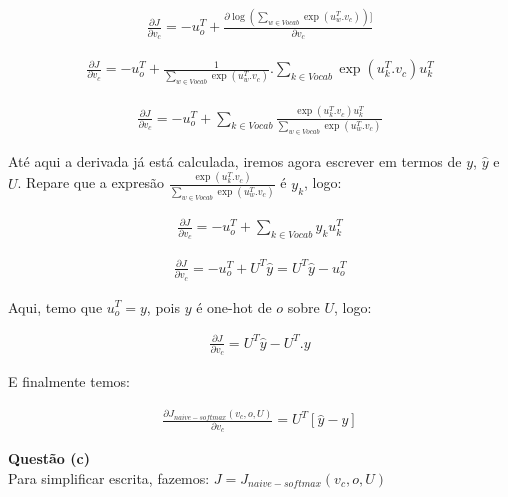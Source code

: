 \documentclass[a4paper,12pt]{article}
\begin{document}
\begin{align*}
\frac{\partial J}{ \partial v_c} = - u_o^T + \frac{ \partial \log( \sum_{w \in Vocab} \exp(  u_w^T . v_c )  )]}{  \partial v_c}
\end{align*}


\begin{align*}
\frac{\partial J}{ \partial v_c} = - u_o^T + \frac{1}{ \sum_{w \in Vocab} \exp(  u_w^T . v_c ) } . \sum_{k \in Vocab} \exp( u_k^T . v_c ) u_k^T
\end{align*}


\begin{align}
\frac{\partial J}{ \partial v_c} = - u_o^T + \sum_{k \in Vocab} \frac{ \exp( u_k^T . v_c ) u_k^T}{ \sum_{w \in Vocab} \exp(  u_w^T . v_c ) }
\end{align}

Até aqui a derivada já está calculada, iremos agora escrever em termos de $y$, $\hat{y}$ e $U$. Repare que a expresão  $\frac{ \exp( u_k^T . v_c )}{ \sum_{w \in Vocab} \exp(  u_w^T . v_c ) }$ é $y_k$, logo:

\begin{align*}
\frac{\partial J}{ \partial v_c} = - u_o^T + \sum_{k \in Vocab} y_k u_k^T
\end{align*}

\begin{align*}
\frac{\partial J}{ \partial v_c} = - u_o^T +  U^T \hat{y} = U^T \hat{y} - u_o^T
\end{align*}

Aqui, temo que $u_o^T = y$, pois $y$ é one-hot de $o$ sobre $U$, logo:

\begin{align}
\frac{\partial J}{ \partial v_c} = U^T \hat{y} - U^T . y 
\end{align}

E finalmente temos:

\begin{align}\label{q_dezen}
\frac{\partial J_{naive-softmax}(v_c, o, U)}{ \partial v_c} = U^T [ \hat{y} - y ]
\end{align}

{\Large \textbf{Questão (c)}}\\

Para simplificar escrita, fazemos: $J = J_{naive-softmax}(v_c, o, U)$
\end{document}
